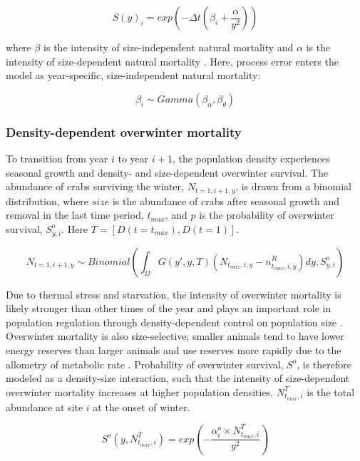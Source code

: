 \documentclass{article}
\begin{document}
\begin{equation}
S(y)_i = exp(-\Delta t(\beta_i+\frac{\alpha}{y^2}))
\end{equation}

where $\beta$ is the intensity of size-independent natural mortality and $\alpha$ is the intensity of size-dependent natural mortality \parencite{carlson2010bayesian}. Here, process error enters the model as year-specific, size-independent natural mortality:

\begin{equation}
\beta_i \sim Gamma(\beta_{\alpha}, \beta_{\theta})
\end{equation}

\subsubsection*{Density-dependent overwinter mortality}

To transition from year $i$ to year $i+1$, the population density experiences seasonal growth and density- and size-dependent overwinter survival. The abundance of crabs surviving the winter, $N_{t=1,i+1,y}$, is drawn from a binomial distribution, where $size$ is the abundance of crabs after seasonal growth and removal in the last time period, $t_{max}$, and $p$ is the probability of overwinter survival, $S^o_{y,i}$. Here $T=[D(t=t_{max}), D(t=1)]$. 

\begin{equation}
N_{t=1,i+1,y} \sim Binomial( \int_{\Omega} G(y',y, T) (N_{t_{max},i,y} - n^R_{t_{max},i,y}) dy,  S^o_{y,i})
\end{equation}

Due to thermal stress and starvation, the intensity of overwinter mortality is likely stronger than other times of the year and plays an important role in population regulation through density-dependent control on population size \parencite{henderson1988size}. Overwinter mortality is also size-selective; smaller animals tend to have lower energy reserves than larger animals and use reserves more rapidly due to the allometry of metabolic rate \parencite{hurst2007causes}. Probability of overwinter survival, $S^o$, is therefore modeled as a density-size interaction, such that the intensity of size-dependent overwinter mortality increases at higher population densities. $N^T_{t_{max},i}$ is the total abundance at site $i$ at the onset of winter.

\begin{equation}
S^o(y,N^T_{t_{max},i}) = exp(-\frac{\alpha_i^o \times N^T_{t_{max},i}}{y^2})
\end{equation}
\end{document}
